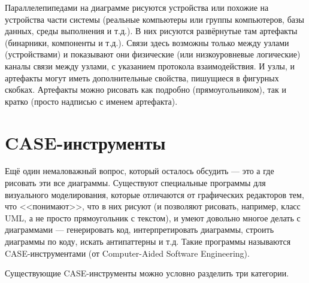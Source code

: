 \documentclass[a5paper]{article}
\begin{document}
Параллелепипедами на диаграмме рисуются устройства или похожие на устройства части системы (реальные компьютеры или группы компьютеров, базы данных, среды выполнения и т.д.). В них рисуются развёрнутые там артефакты (бинарники, компоненты и т.д.). Связи здесь возможны только между узлами (устройствами) и показывают они физические (или низкоуровневые логические) каналы связи между узлами, с указанием протокола взаимодействия. И узлы, и артефакты могут иметь дополнительные свойства, пишущиеся в фигурных скобках. Артефакты можно рисовать как подробно (прямоугольником), так и кратко (просто надписью с именем артефакта).

\section{CASE-инструменты}

Ещё один немаловажный вопрос, который осталось обсудить --- это а где рисовать эти все диаграммы. Существуют специальные программы для визуального моделирования, которые отличаются от графических редакторов тем, что <<понимают>>, что в них рисуют (и позволяют рисовать, например, класс UML, а не просто прямоугольник с текстом), и умеют довольно многое делать с диаграммами --- генерировать код, интерпретировать диаграммы, строить диаграммы по коду, искать антипаттерны и т.д. Такие программы называются CASE-инструментами (от Computer-Aided Software Engineering).

Существующие CASE-инструменты можно условно разделить три категории.
\end{document}
